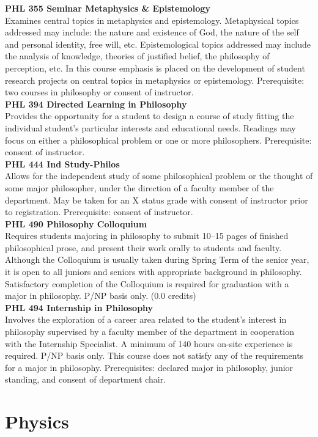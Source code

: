 \documentclass[
  letterpaper,
]{scrbook}
\begin{document}
\textbf{PHL 355 Seminar Metaphysics \& Epistemology}\\
Examines central topics in metaphysics and epistemology. Metaphysical
topics addressed may include: the nature and existence of God, the
nature of the self and personal identity, free will, etc.
Epistemological topics addressed may include the analysis of knowledge,
theories of justified belief, the philosophy of perception, etc. In this
course emphasis is placed on the development of student research
projects on central topics in metaphysics or epistemology. Prerequisite:
two courses in philosophy or consent of instructor.\\
\textbf{PHL 394 Directed Learning in Philosophy}\\
Provides the opportunity for a student to design a course of study
fitting the individual student's particular interests and educational
needs. Readings may focus on either a philosophical problem or one or
more philosophers. Prerequisite: consent of instructor.\\
\textbf{PHL 444 Ind Study-Philos}\\
Allows for the independent study of some philosophical problem or the
thought of some major philosopher, under the direction of a faculty
member of the department. May be taken for an X status grade with
consent of instructor prior to registration. Prerequisite: consent of
instructor.\\
\textbf{PHL 490 Philosophy Colloquium}\\
Requires students majoring in philosophy to submit 10--15 pages of
finished philosophical prose, and present their work orally to students
and faculty. Although the Colloquium is usually taken during Spring Term
of the senior year, it is open to all juniors and seniors with
appropriate background in philosophy. Satisfactory completion of the
Colloquium is required for graduation with a major in philosophy. P/NP
basis only. (0.0 credits)\\
\textbf{PHL 494 Internship in Philosophy}\\
Involves the exploration of a career area related to the student's
interest in philosophy supervised by a faculty member of the department
in cooperation with the Internship Specialist. A minimum of 140 hours
on-site experience is required. P/NP basis only. This course does not
satisfy any of the requirements for a major in philosophy.
Prerequisites: declared major in philosophy, junior standing, and
consent of department chair.

\section{Physics}\label{physics}
\end{document}
